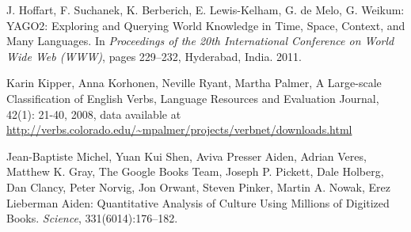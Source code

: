 \documentclass[11pt,a4paper]{article}
\begin{document}
\begin{thebibliography}{99}
 J. Hoffart, F. Suchanek, K. Berberich, E. Lewis-Kelham, G. de Melo, G. Weikum: YAGO2: Exploring and Querying World Knowledge in Time, Space, Context, and Many Languages. In \textit{Proceedings  of the 20th International Conference on World Wide Web (WWW)}, pages 229--232, Hyderabad, India. 2011.

%
%
%
%
%
%
%

 Karin Kipper, Anna Korhonen, Neville Ryant, Martha Palmer,
A Large-scale Classification of English Verbs,
Language Resources and Evaluation Journal, 42(1): 21-40, 2008,
data available at \url{http://verbs.colorado.edu/~mpalmer/projects/verbnet/downloads.html}


 Jean-Baptiste Michel, Yuan Kui Shen, Aviva Presser Aiden, Adrian Veres, Matthew K. Gray, The Google Books Team, Joseph P. Pickett, Dale Holberg, Dan Clancy, Peter Norvig, Jon Orwant, Steven Pinker, Martin A. Nowak, Erez Lieberman Aiden: Quantitative Analysis of Culture Using Millions of Digitized Books. \textit{Science}, 331(6014):176–182.


\end{thebibliography}
\end{document}
